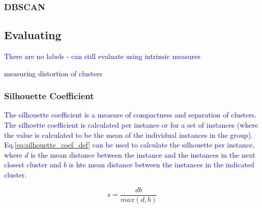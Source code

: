 

\subsubsection{DBSCAN}




\subsection{Evaluating}

\textcolor{blue}{There are no labels - can still evaluate using intrinsic measures}

\textcolor{blue}{measuring distortion of clusters}

\subsubsection{Silhouette Coefficient}

\textcolor{blue}{The {silhouette coefficient} is a measure of compactness and separation of clusters. The silhoette coefficient is calculated per instance or for a set of instances (where the value is calculated to be the mean of the individual instances in the group). Eq.\ref{eq:silhouette_coef_def} can be used to calculate the silhouette per instance, where $d$ is the mean distance between the instance and the instances in the next closest cluster and $b$ is hte mean distance between the instances in the indicated cluster.}

\begin{equation}
{s = \frac{db}{max(d,b)}}
\label{eq:silhouette_coef_def}
\end{equation}





